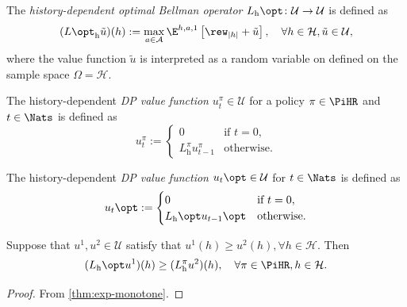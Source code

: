 \begin{definition}\label{def:DPhopt} 
The \emph{history-dependent optimal Bellman operator} $L_{\mathrm{h}}\opt \colon \mathcal{U} \to \mathcal{U}$ is defined as
  \[
    (L\opt_{\mathrm{h}} \tilde{u}) (h)
    :=
    \max_{a\in \mathcal{A}} \E^{h, a, 1} \left[ \rew_{|h|} + \tilde{u} \right], \quad \forall h\in \mathcal{H}, \tilde{u} \in \mathcal{U},
  \]
  where the value function $\tilde{u}$ is interpreted as a random variable on defined on the sample space $\Omega = \mathcal{H}$.
\end{definition}

\begin{definition} \label{def:u-dp-pi}
  The history-dependent \emph{DP value function} $u_t^{\pi} \in \mathcal{U}$ for a policy $\pi\in \PiHR$ and $t\in \Nats$ is defined as
  \[
   u_t^{\pi} :=
   \begin{cases}
     0 &\text{if } t = 0, \\
     L_{\mathrm{h}}^{\pi} u_{t-1}^{\pi} &\text{otherwise}.
   \end{cases}
 \]
\end{definition}

\begin{definition} \label{def:u-dp-opt}
  The history-dependent \emph{DP value function} $u_t\opt \in \mathcal{U}$ for $t\in \Nats$ is defined as
  \[
   u_t\opt  :=
   \begin{cases}
     0 &\text{if } t = 0, \\
     L_{\mathrm{h}}\opt u_{t-1}\opt &\text{otherwise}.
   \end{cases}
 \]
\end{definition}

\begin{lemma}\label{thm:dp-opt-ge-dp-pi}
  Suppose that $u^1, u^2 \in \mathcal{U}$ satisfy that $u^1(h) \ge u^2(h), \forall h\in \mathcal{H}$. Then
  \[
   (L_{\mathrm{h}}\opt u^1)(h) \ge  
   (L_{\mathrm{h}}^{\pi} u^2)(h), \quad \forall \pi\in \PiHR, h\in \mathcal{H}.
  \]
\end{lemma}
\begin{proof}
  From \cref{thm:exp-monotone}.
\end{proof}

